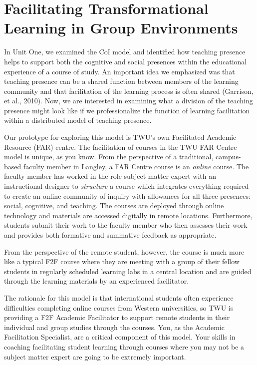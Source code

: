 \documentclass[
]{book}
\begin{document}
\hypertarget{facilitating-transformational-learning-in-group-environments}{%
\section{Facilitating Transformational Learning in Group Environments}\label{facilitating-transformational-learning-in-group-environments}}

In Unit One, we examined the CoI model and identified how teaching presence helps to support both the cognitive and social presences within the educational experience of a course of study. An important idea we emphasized was that teaching presence can be a shared function between members of the learning community and that facilitation of the learning process is often shared (Garrison, et al., 2010). Now, we are interested in examining what a division of the teaching presence might look like if we professionalize the function of learning facilitation within a distributed model of teaching presence.

Our prototype for exploring this model is TWU's own Facilitated Academic Resource (FAR) centre. The facilitation of courses in the TWU FAR Centre model is unique, as you know. From the perspective of a traditional, campus-based faculty member in Langley, a FAR Centre course is an \emph{online} course. The faculty member has worked in the role subject matter expert with an instructional designer to \emph{structure} a course which integrates everything required to create an online community of inquiry with allowances for all three presences: social, cognitive, and teaching. The courses are deployed through online technology and materials are accessed digitally in remote locations. Furthermore, students submit their work to the faculty member who then assesses their work and provides both formative and summative feedback as appropriate.

From the perspective of the remote student, however, the course is much more like a typical F2F course where they are meeting with a group of their fellow students in regularly scheduled learning labs in a central location and are guided through the learning materials by an experienced facilitator.

The rationale for this model is that international students often experience difficulties completing online courses from Western universities, so TWU is providing a F2F Academic Facilitator to support remote students in their individual and group studies through the courses. You, as the Academic Facilitation Specialist, are a critical component of this model. Your skills in coaching facilitating student learning through courses where you may not be a subject matter expert are going to be extremely important.
\end{document}
